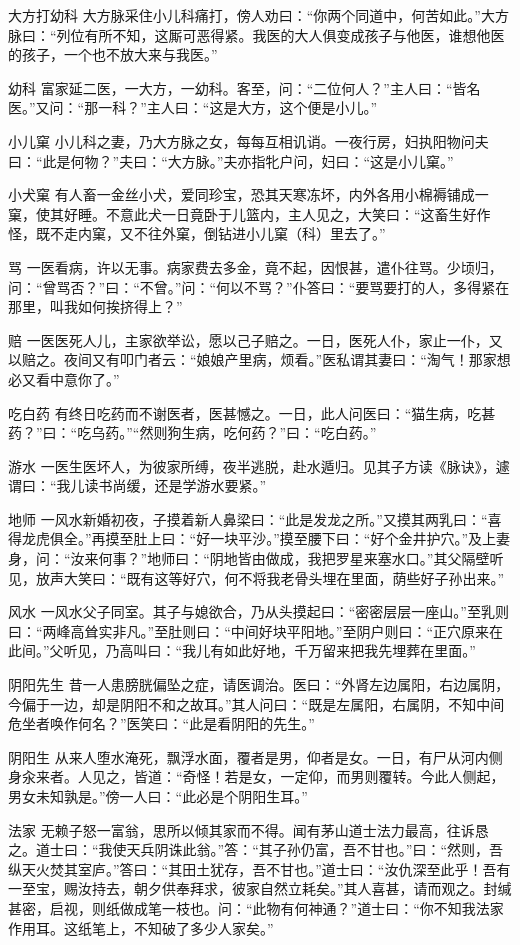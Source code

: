 \documentclass[12pt,UTF8]{ctexbook}
\begin{document}
大方打幼科
大方脉采住小儿科痛打，傍人劝曰：“你两个同道中，何苦如此。”大方脉曰：“列位有所不知，这厮可恶得紧。我医的大人俱变成孩子与他医，谁想他医的孩子，一个也不放大来与我医。”

幼科
富家延二医，一大方，一幼科。客至，问：“二位何人？”主人曰：“皆名医。”又问：“那一科？”主人曰：“这是大方，这个便是小儿。”

小儿窠
小儿科之妻，乃大方脉之女，每每互相讥诮。一夜行房，妇执阳物问夫曰：“此是何物？”夫曰：“大方脉。”夫亦指牝户问，妇曰：“这是小儿窠。”

小犬窠
有人畜一金丝小犬，爱同珍宝，恐其天寒冻坏，内外各用小棉褥铺成一窠，使其好睡。不意此犬一日竟卧于儿篮内，主人见之，大笑曰：“这畜生好作怪，既不走内窠，又不往外窠，倒钻进小儿窠（科）里去了。”

骂
一医看病，许以无事。病家费去多金，竟不起，因恨甚，遣仆往骂。少顷归，问：“曾骂否？”曰：“不曾。”问：“何以不骂？”仆答曰：“要骂要打的人，多得紧在那里，叫我如何挨挤得上？”

赔
一医医死人儿，主家欲举讼，愿以己子赔之。一日，医死人仆，家止一仆，又以赔之。夜间又有叩门者云：“娘娘产里病，烦看。”医私谓其妻曰：“淘气！那家想必又看中意你了。”

吃白药
有终日吃药而不谢医者，医甚憾之。一日，此人问医曰：“猫生病，吃甚药？”曰：“吃乌药。”“然则狗生病，吃何药？”曰：“吃白药。”

游水
一医生医坏人，为彼家所缚，夜半逃脱，赴水遁归。见其子方读《脉诀》，遽谓曰：“我儿读书尚缓，还是学游水要紧。”

地师
一风水新婚初夜，子摸着新人鼻梁曰：“此是发龙之所。”又摸其两乳曰：“喜得龙虎俱全。”再摸至肚上曰：“好一块平沙。”摸至腰下曰：“好个金井护穴。”及上妻身，问：“汝来何事？”地师曰：“阴地皆由做成，我把罗星来塞水口。”其父隔壁听见，放声大笑曰：“既有这等好穴，何不将我老骨头埋在里面，荫些好子孙出来。”

风水
一风水父子同室。其子与媳欲合，乃从头摸起曰：“密密层层一座山。”至乳则曰：“两峰高耸实非凡。”至肚则曰：“中间好块平阳地。”至阴户则曰：“正穴原来在此间。”父听见，乃高叫曰：“我儿有如此好地，千万留来把我先埋葬在里面。”

阴阳先生
昔一人患膀胱偏坠之症，请医调治。医曰：“外肾左边属阳，右边属阴，今偏于一边，却是阴阳不和之故耳。”其人问曰：“既是左属阳，右属阴，不知中间危坐者唤作何名？”医笑曰：“此是看阴阳的先生。”

阴阳生
从来人堕水淹死，飘浮水面，覆者是男，仰者是女。一日，有尸从河内侧身汆来者。人见之，皆道：“奇怪！若是女，一定仰，而男则覆转。今此人侧起，男女未知孰是。”傍一人曰：“此必是个阴阳生耳。”

法家
无赖子怒一富翁，思所以倾其家而不得。闻有茅山道士法力最高，往诉恳之。道士曰：“我使天兵阴诛此翁。”答：“其子孙仍富，吾不甘也。”曰：“然则，吾纵天火焚其室庐。”答曰：“其田土犹存，吾不甘也。”道士曰：“汝仇深至此乎！吾有一至宝，赐汝持去，朝夕供奉拜求，彼家自然立耗矣。”其人喜甚，请而观之。封缄甚密，启视，则纸做成笔一枝也。问：“此物有何神通？”道士曰：“你不知我法家作用耳。这纸笔上，不知破了多少人家矣。”
\end{document}
